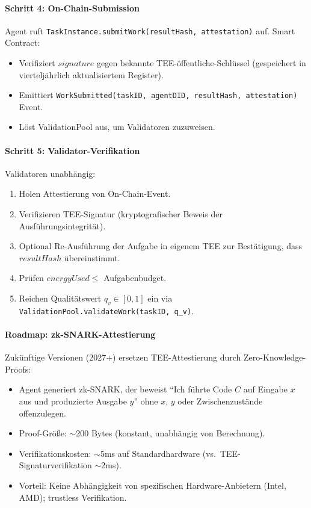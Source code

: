 \documentclass[11pt]{article}
\begin{document}
\paragraph{Schritt 4: On-Chain-Submission}
Agent ruft \texttt{TaskInstance.submitWork(resultHash, attestation)} auf. Smart Contract:
\begin{itemize}[noitemsep]
  \item Verifiziert $signature$ gegen bekannte TEE-öffentliche-Schlüssel (gespeichert in vierteljährlich aktualisiertem Register).
  \item Emittiert \texttt{WorkSubmitted(taskID, agentDID, resultHash, attestation)} Event.
  \item Löst ValidationPool aus, um Validatoren zuzuweisen.
\end{itemize}

\paragraph{Schritt 5: Validator-Verifikation}
Validatoren unabhängig:
\begin{enumerate}[noitemsep]
  \item Holen Attestierung von On-Chain-Event.
  \item Verifizieren TEE-Signatur (kryptografischer Beweis der Ausführungsintegrität).
  \item Optional Re-Ausführung der Aufgabe in eigenem TEE zur Bestätigung, dass $resultHash$ übereinstimmt.
  \item Prüfen $energyUsed \leq$ Aufgabenbudget.
  \item Reichen Qualitätswert $q_v \in [0,1]$ ein via \texttt{ValidationPool.validateWork(taskID, q\_v)}.
\end{enumerate}

\paragraph{Roadmap: zk-SNARK-Attestierung}
Zukünftige Versionen (2027+) ersetzen TEE-Attestierung durch Zero-Knowledge-Proofs:
\begin{itemize}[noitemsep]
  \item Agent generiert zk-SNARK, der beweist ``Ich führte Code $C$ auf Eingabe $x$ aus und produzierte Ausgabe $y$'' ohne $x$, $y$ oder Zwischenzustände offenzulegen.
  \item Proof-Größe: $\sim$200 Bytes (konstant, unabhängig von Berechnung).
  \item Verifikationskosten: $\sim$5ms auf Standardhardware (vs.\ TEE-Signaturverifikation $\sim$2ms).
  \item Vorteil: Keine Abhängigkeit von spezifischen Hardware-Anbietern (Intel, AMD); trustless Verifikation.
\end{itemize}
\end{document}
